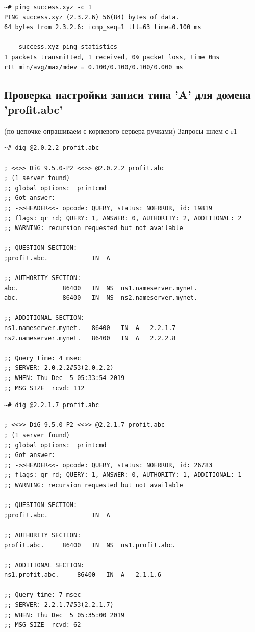 \documentclass[a4paper,12pt]{article}
\begin{document}
\begin{verbatim}
~# ping success.xyz -c 1
PING success.xyz (2.3.2.6) 56(84) bytes of data.
64 bytes from 2.3.2.6: icmp_seq=1 ttl=63 time=0.100 ms

--- success.xyz ping statistics ---
1 packets transmitted, 1 received, 0% packet loss, time 0ms
rtt min/avg/max/mdev = 0.100/0.100/0.100/0.000 ms

\end{verbatim}

\subsection{Проверка настройки записи типа 'A' для домена 'profit.abc'}

(по цепочке опрашиваем с корневого сервера ручками)
Запросы шлем с r1

\begin{verbatim}
~# dig @2.0.2.2 profit.abc

; <<>> DiG 9.5.0-P2 <<>> @2.0.2.2 profit.abc
; (1 server found)
;; global options:  printcmd
;; Got answer:
;; ->>HEADER<<- opcode: QUERY, status: NOERROR, id: 19819
;; flags: qr rd; QUERY: 1, ANSWER: 0, AUTHORITY: 2, ADDITIONAL: 2
;; WARNING: recursion requested but not available

;; QUESTION SECTION:
;profit.abc.			IN	A

;; AUTHORITY SECTION:
abc.			86400	IN	NS	ns1.nameserver.mynet.
abc.			86400	IN	NS	ns2.nameserver.mynet.

;; ADDITIONAL SECTION:
ns1.nameserver.mynet.	86400	IN	A	2.2.1.7
ns2.nameserver.mynet.	86400	IN	A	2.2.2.8

;; Query time: 4 msec
;; SERVER: 2.0.2.2#53(2.0.2.2)
;; WHEN: Thu Dec  5 05:33:54 2019
;; MSG SIZE  rcvd: 112
\end{verbatim}

\begin{verbatim}
~# dig @2.2.1.7 profit.abc

; <<>> DiG 9.5.0-P2 <<>> @2.2.1.7 profit.abc
; (1 server found)
;; global options:  printcmd
;; Got answer:
;; ->>HEADER<<- opcode: QUERY, status: NOERROR, id: 26783
;; flags: qr rd; QUERY: 1, ANSWER: 0, AUTHORITY: 1, ADDITIONAL: 1
;; WARNING: recursion requested but not available

;; QUESTION SECTION:
;profit.abc.			IN	A

;; AUTHORITY SECTION:
profit.abc.		86400	IN	NS	ns1.profit.abc.

;; ADDITIONAL SECTION:
ns1.profit.abc.		86400	IN	A	2.1.1.6

;; Query time: 7 msec
;; SERVER: 2.2.1.7#53(2.2.1.7)
;; WHEN: Thu Dec  5 05:35:00 2019
;; MSG SIZE  rcvd: 62
\end{verbatim}
\end{document}
